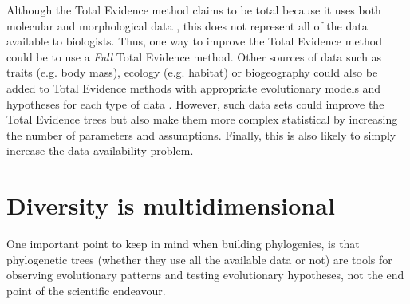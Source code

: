 Although the Total Evidence method claims to be total because it uses both molecular and morphological data \citep{eernissetaxonomic1993}, this does not represent all of the data available to biologists.
Thus, one way to improve the Total Evidence method could be to use a \textit{Full} Total Evidence method.
Other sources of data such as traits (e.g. body mass), ecology (e.g. habitat) or biogeography could also be added to Total Evidence methods with appropriate evolutionary models and hypotheses for each type of data \citep[e.g. respectively quantitative, multiple or geographic state speciation and extinction model -- Qua-Mu-GeoSSE models;][]{fitzjohndiversitree2012}.
However, such data sets could improve the Total Evidence trees but also make them more complex statistical by increasing the number of parameters and assumptions.
Finally, this is also likely to simply increase the data availability problem.

\section{Diversity is multidimensional} %
One important point to keep in mind when building phylogenies, is that phylogenetic trees (whether they use all the available data or not) are tools for observing evolutionary patterns and testing evolutionary hypotheses, not the end point of the scientific endeavour.


